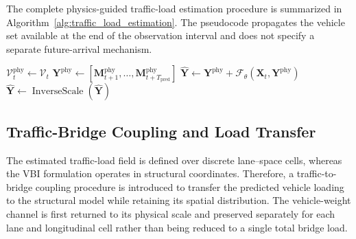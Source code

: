 \documentclass[journal]{IEEEtran}
\begin{document}
The complete physics-guided traffic-load estimation procedure is summarized in Algorithm~\ref{alg:traffic_load_estimation}. The pseudocode propagates the vehicle set available at the end of the observation interval and does not specify a separate future-arrival mechanism.

\begin{algorithm}[!htbp]
\caption{Physics-Guided Spatiotemporal Load-Field Estimation}
\label{alg:traffic_load_estimation}
\footnotesize
{}
$\mathcal{V}^{\mathrm{phy}}_t\leftarrow\mathcal{V}_t$\;
$\mathbf{Y}^{\mathrm{phy}}
\leftarrow[\mathbf{M}^{\mathrm{phy}}_{t+1},\ldots,
\mathbf{M}^{\mathrm{phy}}_{t+T_{\mathrm{pred}}}]$\;
$\widehat{\mathbf{Y}}\leftarrow\mathbf{Y}^{\mathrm{phy}}
+\mathcal{F}_\theta(\mathbf{X}_t,\mathbf{Y}^{\mathrm{phy}})$\;
$\widehat{\mathbf{Y}}\leftarrow
\operatorname{InverseScale}(\widehat{\mathbf{Y}})$\;
\;
\end{algorithm}


\subsection{Traffic-Bridge Coupling and Load Transfer}
\label{sec:traffic_bridge_transfer}

The estimated traffic-load field is defined over discrete lane--space cells, whereas the VBI formulation operates in structural coordinates. Therefore, a traffic-to-bridge coupling procedure is introduced to transfer the predicted vehicle loading to the structural model while retaining its spatial distribution. The vehicle-weight channel is first returned to its physical scale and preserved separately for each lane and longitudinal cell rather than being reduced to a single total bridge load.
\end{document}
